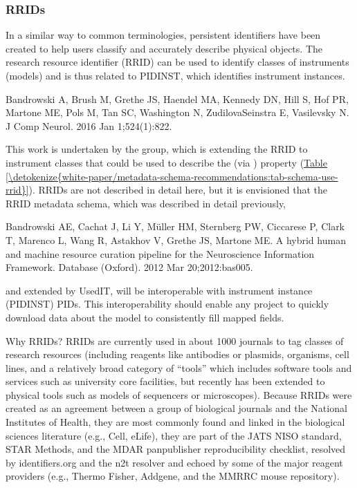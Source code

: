 \documentclass[a4paper,10pt,english]{sphinxmanual}
\begin{document}
\subsubsection{RRIDs}
\label{\detokenize{white-paper/metadata-schema-recommendations:rrids}}
\sphinxAtStartPar
In a similar way to common terminologies, persistent identifiers have
been created to help users classify and accurately describe physical
objects.  The research resource identifier (RRID) can be used to
identify classes of instruments (models) and is thus related to
PIDINST, which identifies instrument instances.%
\begin{footnote}[1]\sphinxAtStartFootnote
Bandrowski A, Brush M, Grethe JS, Haendel MA, Kennedy DN, Hill S, Hof
PR, Martone ME, Pols M, Tan SC, Washington N, Zudilova\sphinxhyphen{}Seinstra E,
Vasilevsky N.  J
Comp Neurol. 2016 Jan 1;524(1):8\sphinxhyphen{}22.
%
\end{footnote}
This work is undertaken by the  group, which is extending the
RRID to instrument classes that could be used to describe the 
(via ) property (\hyperref[\detokenize{white-paper/metadata-schema-recommendations:tab-schema-use-rrid}]{Table \ref{\detokenize{white-paper/metadata-schema-recommendations:tab-schema-use-rrid}}}).
RRIDs are not described in detail here, but it is envisioned that the
RRID metadata schema, which was described in detail
previously,%
\begin{footnote}[2]\sphinxAtStartFootnote
Bandrowski AE, Cachat J, Li Y, Müller HM, Sternberg PW, Ciccarese P,
Clark T, Marenco L, Wang R, Astakhov V, Grethe JS, Martone ME. A
hybrid human and machine resource curation pipeline for the
Neuroscience Information Framework. Database (Oxford). 2012 Mar
20;2012:bas005. 
%
\end{footnote} and extended by UsedIT, will be
interoperable with instrument instance (PIDINST) PIDs.  This
interoperability should enable any project to quickly download data
about the model to consistently fill mapped fields.

\sphinxAtStartPar
Why RRIDs? RRIDs are currently used in about 1000 journals to tag
classes of research resources (including reagents like antibodies or
plasmids, organisms, cell lines, and a relatively broad category of
“tools” which includes software tools and services such as university
core facilities, but recently has been extended to physical tools such
as models of sequencers or microscopes).  Because RRIDs were created
as an agreement between a group of biological journals and the
National Institutes of Health, they are most commonly found and linked
in the biological sciences literature (e.g., Cell, eLife), they are
part of the JATS NISO standard, STAR Methods, and the MDAR
pan\sphinxhyphen{}publisher reproducibility checklist, resolved by identifiers.org
and the n2t resolver and echoed by some of the major reagent providers
(e.g., Thermo Fisher, Addgene, and the MMRRC mouse repository).
\end{document}
